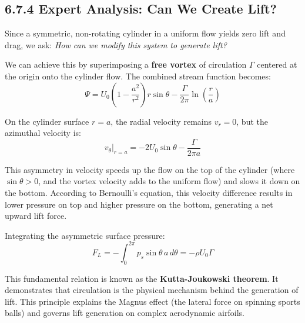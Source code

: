 \newpage
\subsection{6.7.4 Expert Analysis: Can We Create Lift?}

\begin{expertbox}
Since a symmetric, non-rotating cylinder in a uniform flow yields zero lift and drag, we ask: \textit{How can we modify this system to generate lift?}

We can achieve this by superimposing a \textbf{free vortex} of circulation $\Gamma$ centered at the origin onto the cylinder flow. The combined stream function becomes:
$$\Psi = U_0 \left( 1 - \frac{a^2}{r^2} \right) r \sin\theta - \frac{\Gamma}{2\pi} \ln\left(\frac{r}{a}\right)$$

On the cylinder surface $r = a$, the radial velocity remains $v_r = 0$, but the azimuthal velocity is:
$$v_\theta\big|_{r=a} = -2 U_0 \sin\theta - \frac{\Gamma}{2\pi a}$$

This asymmetry in velocity speeds up the flow on the top of the cylinder (where $\sin\theta > 0$, and the vortex velocity adds to the uniform flow) and slows it down on the bottom. According to Bernoulli's equation, this velocity difference results in lower pressure on top and higher pressure on the bottom, generating a net upward lift force.

Integrating the asymmetric surface pressure:
$$F_L = -\int_{0}^{2\pi} p_s \sin\theta \, a \, d\theta = -\rho U_0 \Gamma$$

This fundamental relation is known as the \textbf{Kutta-Joukowski theorem}. It demonstrates that circulation is the physical mechanism behind the generation of lift. This principle explains the Magnus effect (the lateral force on spinning sports balls) and governs lift generation on complex aerodynamic airfoils.
\end{expertbox}
